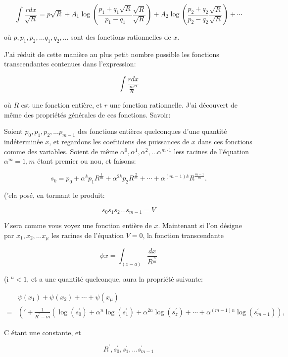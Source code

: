 \documentclass{article}
\begin{document}
\[
\int \frac{r d x}{\sqrt{R}}=p \sqrt{R}+A_{1} \log \left(\frac{p_{1}+q_{1} \sqrt{R}}{p_{1}-q_{1}} \frac{\sqrt{R}}{\sqrt{R}}\right)+A_{2} \log \left(\frac{p_{2}+q_{2}}{p_{2}-q_{2}} \frac{\sqrt{R}}{\sqrt{R}}\right)+\cdots
\]

où \(p, p_{1}, p_{2}, \ldots q_{1}, q_{2}, \ldots\) sont des fonctions rationnelles de \(x\).

J'ai réduit de cette manière au plus petit nombre possible les fonctions transcendantes contenues dans l'expression:

\[
\int \frac{r d x}{\frac{m}{R}^{n}}
\]

où \(R\) est une fonction entière, et \(r\) une fonction rationnelle. J'ai découvert de même des propriétés générales de ces fonctions. Savoir:

Soient \(p_{0}, p_{1}, p_{2}, \ldots p_{m-1}\) des fonctions entières quelconques d'une quantité indéterminée \(x\), et regardons les coefticiens des puissances de \(x\) dans ces fonctions comme des variables. Soient de même \(\alpha^{0}, \alpha^{1}, \alpha^{2}, \ldots \alpha^{m \cdot 1}\) less racines de l'équation \(\alpha^{m}=1, m\) étant premier ou nou, et faisons:

\[
s_{k}=p_{0}+\alpha^{k} p_{1} R^{\frac{1}{m}}+\alpha^{2 k} p_{2} R^{\frac{2}{m}}+\cdots+\alpha^{(m-1) k} R^{\frac{m-1}{m}} .
\]

('ela posé, en tormant le produit:

\[
s_{0} s_{1} s_{2} \ldots s_{m-1}=V
\]

\(V\) sera comme vous voyez une fonction entière de \(x\). Maintenant si l'on désigne par \(x_{1}, x_{2}, \ldots x_{\mu}\) les racines de l'équation \(V=0\), la fonction transcendante

\[
\psi x=\int_{(x-a)} \frac{d x}{R^{\frac{n}{m}}}
\]

(ì \({ }^{n}<1\), et a une quantité quelconque, aura la propriété suivante:

\[
\begin{aligned}
& \psi\left(x_{1}\right)+\psi\left(x_{2}\right)+\cdots+\psi\left(x_{\mu}\right) \\
= & \left('+\frac{1}{R^{\prime}-m}\left(\log \left(s_{0}^{\prime}\right)+\alpha^{n} \log \left(s_{1}^{\prime}\right)+\alpha^{2 n} \log \left(s_{z}^{\prime}\right)+\cdots+\alpha^{(m-1) n} \log \left(s_{m-1}^{\prime}\right)\right),\right.
\end{aligned}
\]

C étant une constante, et

\[
R^{\prime}, s_{0}^{\prime}, s_{1}^{\prime}, \ldots s_{m-1}^{\prime}
\]
\end{document}
